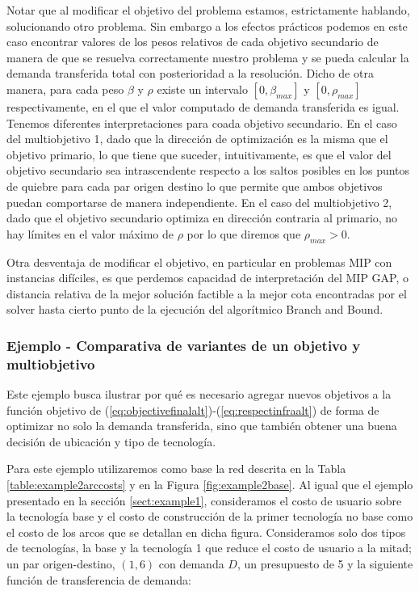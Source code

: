 \documentclass{article}
\begin{document}
  Notar que al modificar el objetivo del problema estamos, estrictamente hablando, solucionando otro problema. Sin embargo a los efectos prácticos podemos en este caso encontrar valores de los pesos relativos de cada objetivo secundario de manera de que se resuelva correctamente nuestro problema y se pueda calcular la demanda transferida total con posterioridad a la resolución. Dicho de otra manera, para cada peso $\beta$ y $\rho$ existe un intervalo $[0, \beta_{max}]$ y $[0, \rho_{max}]$ respectivamente, en el que el valor computado de demanda transferida es igual. Tenemos diferentes interpretaciones para coada objetivo secundario. En el caso del multiobjetivo 1, dado que la dirección de optimización es la misma que el objetivo primario, lo que tiene que suceder, intuitivamente, es que el valor del objetivo secundario sea intrascendente respecto a los saltos posibles en los puntos de quiebre para cada par origen destino lo que permite que ambos objetivos puedan comportarse de manera independiente. En el caso del multiobjetivo 2, dado que el objetivo secundario optimiza en dirección contraria al primario, no hay límites en el valor máximo de $\rho$ por lo que diremos que $\rho_{max} > 0$.

  Otra desventaja de modificar el objetivo, en particular en problemas MIP con instancias difíciles, es que perdemos capacidad de interpretación del MIP GAP, o distancia relativa de la mejor solución factible a la mejor cota encontradas por el solver hasta cierto punto de la ejecución del algorítmico Branch and Bound.

  \subsubsection{Ejemplo - Comparativa de variantes de un objetivo y multiobjetivo}
  \label{sect:example2}

  Este ejemplo busca ilustrar por qué es necesario agregar nuevos objetivos a la función objetivo de (\ref{eq:objectivefinalalt})-(\ref{eq:respectinfraalt}) de forma de optimizar no solo la demanda transferida, sino que también obtener una buena decisión de ubicación y tipo de tecnología.

  Para este ejemplo utilizaremos como base la red descrita en la Tabla \ref{table:example2arccosts} y en la Figura \ref{fig:example2base}. Al igual que el ejemplo presentado en la sección \ref{sect:example1}, consideramos el costo de usuario sobre la tecnología base y el costo de construcción de la primer tecnología no base como el costo de los arcos que se detallan en dicha figura. Consideramos solo dos tipos de tecnologías, la base y la tecnología 1 que reduce el costo de usuario a la mitad; un par origen-destino, $(1, 6)$ con demanda $D$, un presupuesto de 5 y la siguiente función de transferencia de demanda:
\end{document}
